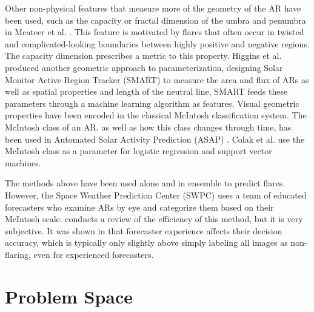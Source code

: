 Other non-physical features that measure more of the geometry of the AR have been used, such as the capacity or fractal dimension of the umbra and penumbra in Mcateer et al. \cite{mcateer_gallagher_conlon_2010}. This feature is motivated by flares that often occur in twisted and complicated-looking boundaries between highly positive and negative regions. The capacity dimension prescribes a metric to this property. Higgins et al. \cite{higgins_gallagher_mcateer_bloomfield_2011} produced another geometric approach to parameterization, designing Solar Monitor Active Region Tracker (SMART) to measure the area and flux of ARs as well as spatial properties and length of the neutral line, SMART feeds these parameters through a machine learning algorithm as features. Visual geometric properties have been encoded in the classical McIntosh \cite{MCintosh} classification system. The McIntosh class of an AR, as well as how this class changes through time, has been used in Automated Solar Activity Prediction (ASAP) \cite{colak_qahwaji_2007} \cite{colak_qahwaji_2009}. Colak et al. use the McIntosh class as a parameter for logistic regression and support vector machines.

The methods above have been used alone and in ensemble to predict flares. However, the Space Weather Prediction Center (SWPC) uses a team of educated forecasters who examine ARs by eye and categorize them based on their McIntosh \cite{MCintosh} scale.  \cite{VerificationCurrentMethod} conducts a review of the efficiency of this method, but it is very subjective. It was shown in \cite{VerificationCurrentMethod} that forecaster experience affects their decision accuracy, which is typically only slightly above simply labeling all images as non-flaring, even for experienced forecasters.

\section{Problem Space}
\label{sec:problemspace}

